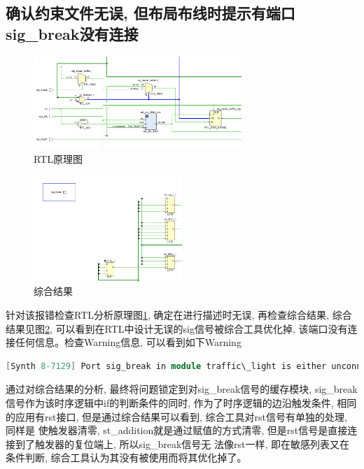 \documentclass{article}
\begin{document}
\subsection*{确认约束文件无误, 但布局布线时提示有端口sig\_break没有连接}
\begin{figure}[H]
    \centering
    \includegraphics[width=0.7\textwidth]{image/2024-06-19-17-41-30.png}
    \caption{RTL原理图}
    \label{image_QA_1}
\end{figure}
\begin{figure}[htbp]
    \centering
    \includegraphics[width=0.5\textwidth]{image/2024-06-19-17-44-00.png}
    \caption{综合结果}
    \label{image_QA_2}
\end{figure}
针对该报错检查RTL分析原理图\ref{image_QA_1}, 确定在进行描述时无误, 再检查综合结果, 综合结果见图\ref{image_QA_2}, 
可以看到在RTL中设计无误的sig信号被综合工具优化掉, 该端口没有连接任何信息。检查Warning信息, 可以看到如下Warning\\
\begin{lstlisting}[language=Verilog]
[Synth 8-7129] Port sig_break in module traffic\_light is either unconnected or has no load
\end{lstlisting}
通过对综合结果的分析, 最终将问题锁定到对sig\_break信号的缓存模块, sig\_break信号作为该时序逻辑中if的判断条件的同时,
作为了时序逻辑的边沿触发条件, 相同的应用有rst接口, 但是通过综合结果可以看到, 综合工具对rst信号有单独的处理, 同样是
使触发器清零, st\_addition就是通过赋值的方式清零, 但是rst信号是直接连接到了触发器的复位端上, 所以sig\_break信号无
法像rst一样, 即在敏感列表又在条件判断, 综合工具认为其没有被使用而将其优化掉了。\\
\end{document}

